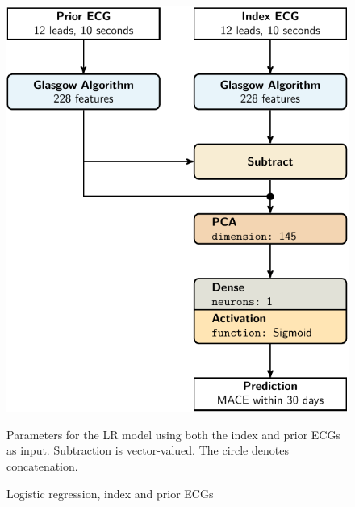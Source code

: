 \documentclass[preprint]{elsarticle}
\begin{document}
\begin{figure}[H]
\centering
\includegraphics[scale=\modelscale,keepaspectratio,trim=0 0 -16em 0]{figures/model-lr2.pdf}
\caption{Logistic regression, index and prior ECGs}
\medskip
\small
Parameters for the LR model using both the index and prior ECGs as input. Subtraction is vector-valued. The circle denotes concatenation. 
\end{figure}
\end{document}
